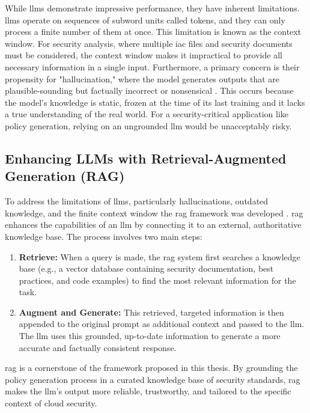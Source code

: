While \glspl{llm} demonstrate impressive performance, they have inherent limitations. \glspl{llm} operate on sequences of subword units called tokens, and they can only process a finite number of them at once. This limitation is known as the context window. For security analysis, where multiple \gls{iac} files and security documents must be considered, the context window makes it impractical to provide all necessary information in a single input. Furthermore, a primary concern is their propensity for "hallucination," where the model generates outputs that are plausible-sounding but factually incorrect or nonsensical \cite{haque_sok_2025-1}. This occurs because the model's knowledge is static, frozen at the time of its last training and it lacks a true understanding of the real world. For a security-critical application like policy generation, relying on an ungrounded \gls{llm} would be unacceptably risky.

\subsection{Enhancing LLMs with Retrieval-Augmented Generation (RAG)}
To address the limitations of \glspl{llm}, particularly hallucinations, outdated knowledge, and the finite context window the \gls{rag} framework was developed \cite{lewis_retrieval-augmented_2020}. \gls{rag} enhances the capabilities of an \gls{llm} by connecting it to an external, authoritative knowledge base. The process involves two main steps:
\begin{enumerate}
    \item \textbf{Retrieve:} When a query is made, the \gls{rag} system first searches a knowledge base (e.g., a vector database containing security documentation, best practices, and code examples) to find the most relevant information for the task.
    \item \textbf{Augment and Generate:} This retrieved, targeted information is then appended to the original prompt as additional context and passed to the \gls{llm}. The \gls{llm} uses this grounded, up-to-date information to generate a more accurate and factually consistent response.
\end{enumerate}
\gls{rag} is a cornerstone of the framework proposed in this thesis. By grounding the policy generation process in a curated knowledge base of security standards, \gls{rag} makes the \gls{llm}'s output more reliable, trustworthy, and tailored to the specific context of cloud security.


